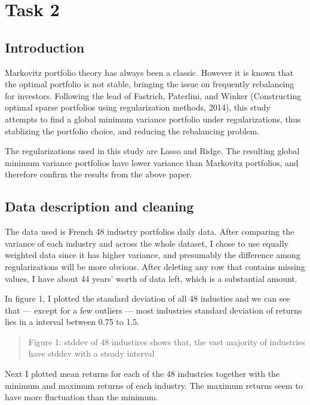 \documentclass{article}
\newcommand{\ciapdf}[1]{\vspace*{-\parskip}\begin{center}\resizebox{0.75\textwidth}{!}{\texttt{[image: \#1]}}\end{center}}
\begin{document}
\section*{Task 2}

\subsection*{Introduction}

Markovitz portfolio theory has always been a classic. However it is known that
the optimal portfolio is not stable, bringing the issue on frequently rebalancing
for investors. Following the lead of Fastrich, Paterlini, and Winker (Constructing
optimal sparse portfolios using regularization methods, 2014), this study
attempts to find a global minimum variance portfolio under regularizations,
thus stablizing the portfolio choice, and reducing the rebalancing problem.

The regularizations used in this study are Lasso and Ridge. The resulting global
minimum variance portfolios have lower variance than Markovitz portfolios, and
therefore confirm the results from the above paper.

\subsection*{Data description and cleaning}

The data used is French 48 industry portfolios daily data. After comparing the variance
of each industry and across the whole dataset, I chose to use equally weighted data
since it has higher variance, and presumably the difference among regularizations
will be more obvious. After deleting any row that contains missing values, I have
about 44 years' worth of data left, which is a substantial amount.

In figure 1, I plotted the standard deviation of all 48 industies and we can see that ---
except for a few outliers --- most industries standard deviation of returns lies
in a interval between 0.75 to 1.5.

\ciapdf{Figure_1T2.pdf}

\begin{quote}
Figure 1: stddev of 48 industires shows that, the vast majority of industries
have stddev with a steady interval
\end{quote}

Next I plotted mean returns for each of the 48 industries together with the minimum and maximum
returns of each industry. The maximum returns seem to have more fluctuation than
the minimum.
\end{document}
